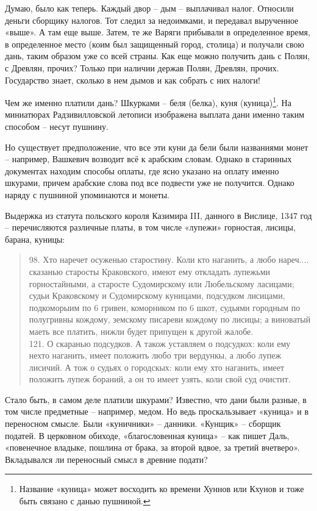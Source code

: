 Думаю, было как теперь. Каждый двор – дым – выплачивал налог. Относили деньги сборщику налогов. Тот следил за недоимками, и передавал вырученное «выше». А там еще выше. Затем, те же Варяги прибывали в определенное время, в определенное место (коим был защищенный город, столица) и получали свою дань, таким образом уже со всей страны. Как еще можно получить дань с Полян, с Древлян, прочих? Только при наличии держав Полян, Древлян, прочих. Государство знает, сколько в нем дымов и как собрать с них налоги!

Чем же именно платили дань? Шкурками – беля (белка), куня (куница)\footnote{Название «куница» может восходить ко времени Хуннов или Кхунов и тоже быть связано с данью пушниной.}. На миниатюрах Радзивилловской летописи изображена выплата дани именно таким способом – несут пушнину.

Но существует предположение, что все эти куни да бели были названиями монет – например, Вашкевич возводит всё к арабским словам. Однако в старинных документах находим способы оплаты, где ясно указано на оплату именно шкурами, причем арабские слова под все подвести уже не получится. Однако наряду с пушниной упоминаются и монеты.

Выдержка из статута польского короля Казимира III, данного в Вислице, 1347 год – перечисляются различные платы, в том числе «лупежи» горностая, лисицы, барана, куницы:

\begin{quotation}
98. Хто наречет осуженью старостину. Коли кто наганить, а любо нареч.... сказанью старосты Краковского, имеют ему откладать лупежьми горностайными, а старосте Судомирскому или Любельскому ласицами; судьи Краковскому и Судомирскому куницами, подсудком лисицами, подкоморыим по 6 гривен, коморником по 6 шкот, судьями городным по полугривны кождому, земскому писареви кождому по лисицы; а виноватый маеть все платить, нижли будет припущен к другой жалобе.\\

121. О скаранью подсудков. А також уставляем о подсудкох: коли ему нехто наганить, имеет положить любо три вердункы, а любо лупеж лисичий. А тож о судьях о городскых: коли ему хто наганить, имеет положить лупеж бораний, а он то имеет узять, коли свой суд очистит.
\end{quotation}

Стало быть, в самом деле платили шкурами? Известно, что дани были разные, в том числе предметные – например, медом. Но ведь проскальзывает «куница» и в переносном смысле. Были «куничники» – данники. «Кунщик» – сборщик податей. В церковном обиходе, «благословенная куница» – как пишет Даль, «повенечное владыке, пошлина от брака, за второй вдвое, за третий вчетверо». Вкладывался ли переносный смысл в древние подати?

